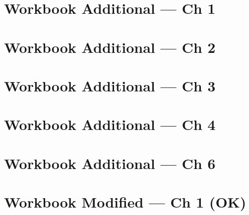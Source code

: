\documentclass[12pt, fleqn, openany, oneside]{studyGuide}
\begin{document}

\chapter{Workbook Additional — Ch 1}


\chapter{Workbook Additional — Ch 2}




\chapter{Workbook Additional — Ch 3}




\chapter{Workbook Additional — Ch 4}


\chapter{Workbook Additional — Ch 6}



\chapter{Workbook Modified — Ch 1 (OK)}

\end{document}
